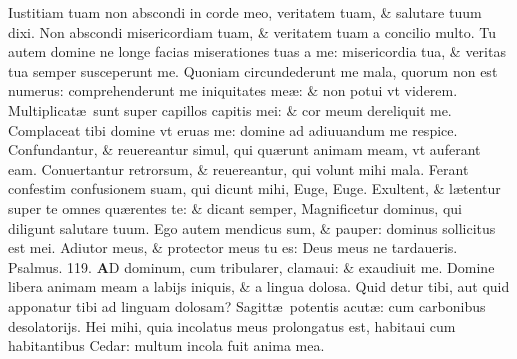 \documentclass[a5paper,10pt]{book}
\def\ae{æ}
\begin{document}
\begin{multicols*}{2}
\newline \color{red} I\color{black}ustitiam tuam non abscondi in corde meo, veritatem tuam, \& salutare tuum dixi.
\newline \color{red} N\color{black}on abscondi misericordiam tuam, \& veritatem tuam a concilio multo.
\newline \color{red} T\color{black}u autem domine ne longe facias miserationes tuas a me: misericordia tua, \& veritas tua semper susceperunt me.
\newline \color{red} Q\color{black}uoniam circundederunt me mala, quorum non est numerus: comprehenderunt me iniquitates me\ae : \& non potui vt viderem.
\newline \color{red} M\color{black}ultiplicat\ae \ sunt super capillos capitis mei: \& cor meum dereliquit me.
\newline \color{red} C\color{black}omplaceat tibi domine vt eruas me: domine ad adiuuandum me respice.
\newline \color{red} C\color{black}onfundantur, \& reuereantur simul, qui qu\ae runt animam meam, vt auferant eam.
\newline \color{red} C\color{black}onuertantur retrorsum, \& reuereantur, qui volunt mihi mala.
\newline \color{red} F\color{black}erant confestim confusionem suam, qui dicunt mihi, Euge, Euge.
\newline \color{red} E\color{black}xultent, \& l\ae tentur super te omnes qu\ae rentes te: \& dicant semper, Magnificetur dominus, qui diligunt salutare tuum.
\newline \color{red} E\color{black}go autem mendicus sum, \& pauper: dominus sollicitus est mei.
\newline \color{red} A\color{black}diutor meus, \& protector meus tu es: Deus meus ne tardaueris.
\newline \color{red} Psalmus. \hypertarget{ps119}{119.} \color{black}
\vspace{-.5em}
\lettrine[lines=2]{\bfseries \color{red} A}{}D dominum, cum tribularer, clamaui: \& exaudiuit me.
\newline \color{red} D\color{black}omine libera animam meam a labijs iniquis, \& a lingua dolosa.
\newline \color{red} Q\color{black}uid detur tibi, aut quid apponatur tibi ad linguam dolosam?
\newline \color{red} S\color{black}agitt\ae \ potentis acut\ae : cum carbonibus desolatorijs.
\newline \color{red} H\color{black}ei mihi, quia incolatus meus prolongatus est, habitaui cum habitantibus Cedar: multum incola fuit anima mea.%

\end{multicols*}
\end{document}
